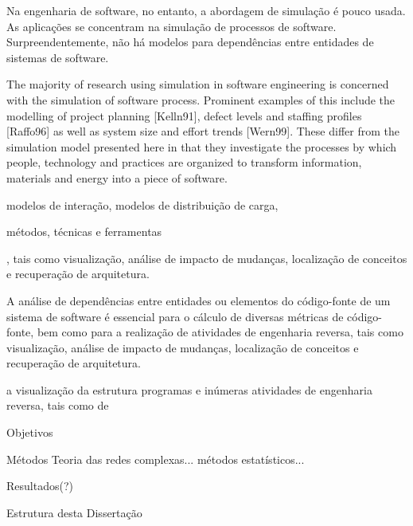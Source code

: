 Na engenharia de software, no entanto, a abordagem de simulação é pouco usada. As aplicações se concentram na simulação de processos de software. Surpreendentemente, não há modelos para dependências entre entidades de sistemas de software.


The majority of research using simulation in software engineering is concerned with the simulation of software process. Prominent examples of this include the modelling of project planning [Kelln91], defect levels and staffing profiles [Raffo96] as well as system size and effort trends [Wern99]. These differ from the simulation model presented here in that they investigate the processes by which people, technology and practices are organized to transform information, materials and energy into a piece of software.



modelos de interação, modelos de distribuição de carga, 

métodos, técnicas e ferramentas


, tais como visualização, análise de impacto de mudanças, localização de conceitos e recuperação de arquitetura. 



A análise de dependências entre entidades ou elementos do código-fonte de um sistema de software é essencial para o cálculo de diversas métricas de código-fonte, bem como para a realização de atividades de engenharia reversa, tais como visualização, análise de impacto de mudanças, localização de conceitos e recuperação de arquitetura. 

a visualização da estrutura programas e inúmeras atividades de engenharia reversa, tais como de


%

\begin{section}{Objetivos}
\end{section}

\begin{section}{Métodos}
	Teoria das redes complexas... métodos estatísticos...
\end{section}

\begin{section}{Resultados(?)}
\end{section}


\begin{section}{Estrutura desta Dissertação}	
\end{section}